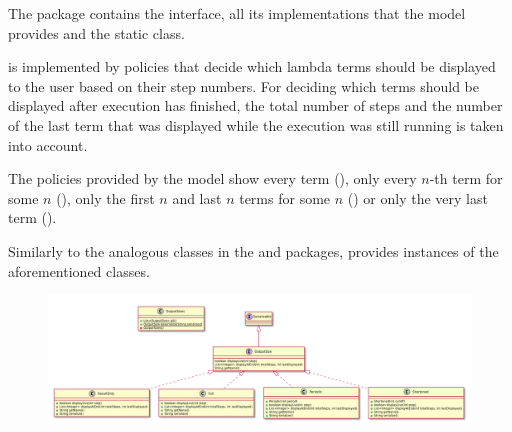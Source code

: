 The \texttt{} package contains the \texttt{} interface, all
its implementations that the model provides and the \texttt{} static
class.

\texttt{} is implemented by policies that decide which lambda terms should be
displayed to the user based on their step numbers. For deciding which terms should
be displayed after execution has finished, the total number of steps and the number of
the last term that was displayed while the execution was still running is taken into
account.

The policies provided by the model show every term (\texttt{}), only every
$n$-th term for some $n$ (\texttt{}), only the first $n$ and last $n$ terms
for some $n$ (\texttt{}) or only the very last term (\texttt{}).

Similarly to the analogous classes in the \texttt{} and \texttt{} packages,
\texttt{} provides instances of the aforementioned classes.

\begin{figure}[H]
	\centering
	\includegraphics[width=\textwidth]{packageDiagrams/modelOutputPackage}
\end{figure}
